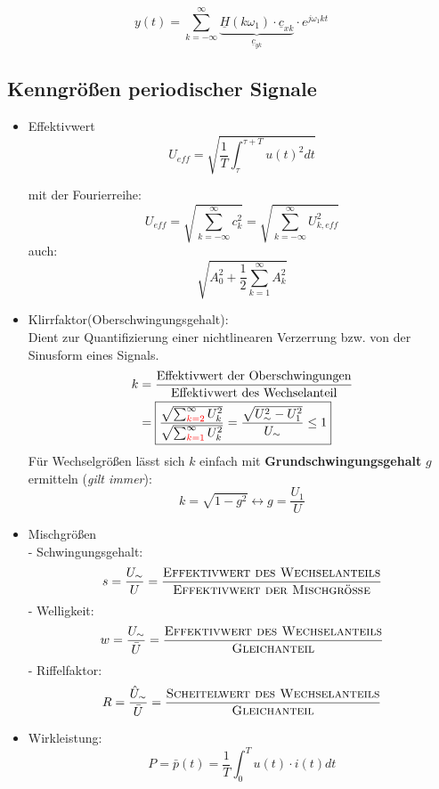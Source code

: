 \[
    y(t) = \sum_{k=-\infty}^{\infty} \underbrace{\underline{H}(k\omega_1)\cdot\underline{c}_{xk}}_{\underline{c}_{yk}} \cdot e^{j\omega_1 k t}
\]

\subsection{Kenngrößen periodischer Signale}
\begin{itemize}
    \item Effektivwert
        \[
            \boxed{U_{\mathit{eff}} = \sqrt{\frac{1}{T} \int_\tau^{\tau+T} u(t)^2 dt}}
        \]
    \begin{mdframed}[style=exercise]
        mit der Fourierreihe:
        $$ U_{\mathit{eff}} = \sqrt{\sum_{k=-\infty}^{\infty} c_k^2} = \sqrt{\sum_{k=-\infty}^{\infty}U_{k,\mathit{eff}}^2} $$
        auch:
        $$ \sqrt{A_0^2 + \frac{1}{2} \sum_{k=1}^{\infty} A_k^2} $$
    \end{mdframed}
    \item Klirrfaktor(Oberschwingungsgehalt):\\
        Dient zur Quantifizierung einer nichtlinearen Verzerrung bzw. von der
        Sinusform eines Signals.
        \begin{align*}
            k &= \frac{\text{Effektivwert der Oberschwingungen}}{\text{Effektivwert des Wechselanteil}} \\
            &= \boxed{\frac{\sqrt{\sum_{{\color{red}{k=2}}}^{\infty} U_{k}^{2}}}{\sqrt{\sum_{{\color{red}{k=1}}}^{\infty} U_{k}^{2}}} = \frac{\sqrt{U_\sim^2 - U_1^2}}{U_\sim} \leq 1}
        \end{align*}
        Für Wechselgrößen lässt sich $k$ einfach mit \textbf{Grundschwingungsgehalt} $g$ ermitteln (\textit{gilt immer}):
        \[
            \boxed{k = \sqrt{1-g^2} \leftrightarrow g = \frac{U_1}{U}}
        \]
    \item Mischgrößen\\
        - Schwingungsgehalt:
        \[
            s = \frac{U_\sim}{U} = \frac{\textsc{Effektivwert des Wechselanteils}}{\textsc{Effektivwert der Mischgröße}}
        \]
        - Welligkeit:
        \[
            w = \frac{U_\sim}{\bar{U}} = \frac{\textsc{Effektivwert des Wechselanteils}}{\textsc{Gleichanteil}}
        \]
        - Riffelfaktor:
        \[
            R = \frac{\hat{U}_\sim}{\bar{U}} = \frac{\textsc{Scheitelwert des Wechselanteils}}{\textsc{Gleichanteil}}
        \]
    \item Wirkleistung:
        \[
            P = \bar{p}(t) = \frac{1}{T} \int_0^T u(t)\cdot i(t) dt
\]
\end{itemize}
